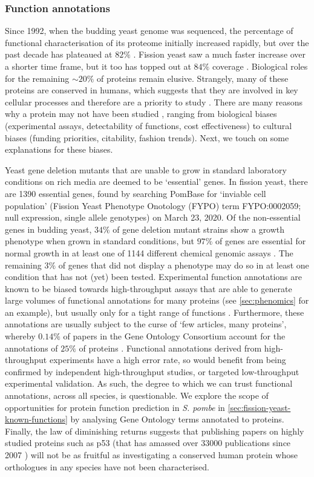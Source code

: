 \subsubsection{Function annotations}

Since 1992, when the budding yeast genome was sequenced, the percentage of functional characterisation of its proteome initially increased rapidly, but over the past decade has plateaued at $82\%$ \cite{Wood2019}. Fission yeast saw a much faster increase over a shorter time frame, but it too has topped out at $84\%$ coverage \cite{Wood2019}. Biological roles for the remaining $\sim 20\%$ of proteins remain elusive. Strangely, many of these proteins are conserved in humans, which suggests that they are involved in key cellular processes and therefore are a priority to study \cite{Wood2019}. There are many reasons why a protein may not have been studied \cite{Stoeger2018}, ranging from biological biases (experimental assays, detectability of functions, cost effectiveness) to cultural biases (funding priorities, citability, fashion trends). Next, we touch on some explanations for these biases.

Yeast gene deletion mutants that are unable to grow in standard laboratory conditions on rich media are deemed to be `essential' genes. In fission yeast, there are \num{1390} essential genes, found by searching PomBase \cite{Lock2018} for `inviable cell population' (Fission Yeast Phenotype Onotology (FYPO) \cite{Harris2013} term FYPO:0002059; null expression, single allele genotypes) on March 23, 2020. Of the non-essential genes in budding yeast, $34\%$ of gene deletion mutant strains show a growth phenotype when grown in standard conditions, but $97\%$ of genes are essential for normal growth in at least one of \num{1144} different chemical genomic assays \cite{Hillenmeyer2008}. The remaining $3\%$ of genes that did not display a phenotype may do so in at least one condition that has not (yet) been tested. Experimental function annotations are known to be biased towards high-throughput assays that are able to generate large volumes of functional annotations for many proteins (see \ref{sec:phenomics} for an example), but usually only for a tight range of functions \cite{Schnoes2013}. Furthermore, these annotations are usually subject to the curse of `few articles, many proteins', whereby $0.14\%$ of papers in the Gene Ontology Consortium account for the annotations of $25\%$ of proteins \cite{Schnoes2013}. Functional annotations derived from high-throughput experiments have a high error rate, so would benefit from being confirmed by independent high-throughput studies, or targeted low-throughput experimental validation. As such, the degree to which we can trust functional annotations, across all species, is questionable. We explore the scope of opportunities for protein function prediction in \emph{S. pombe} in \ref{sec:fission-yeast-known-functions} by analysing Gene Ontology terms annotated to proteins. Finally, the law of diminishing returns suggests that publishing papers on highly studied proteins such as p53 (that has amassed over \num{33000} publications since 2007 \cite{Wood2019}) will not be as fruitful as investigating a conserved human protein whose orthologues in any species have not been characterised.

